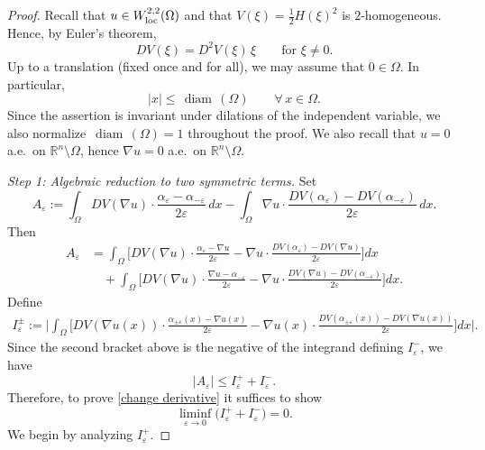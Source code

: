 \documentclass[reqno,11pt]{amsart}
\def\diam{{\mathop\mathrm{\,diam\,}}}
\numberwithin{equation}{section}
\theoremstyle{remark}
\begin{document}
\begin{proof}
Recall that $u\in W^{2,2}_{\rm loc}(\Omega)$ and that $V(\xi)=\frac12 H(\xi)^2$ is $2$-homogeneous. Hence, by Euler's theorem,
\[
DV(\xi)=D^2V(\xi)\,\xi \qquad \text{for }\xi\neq 0.
\]
Up to a translation (fixed once and for all), we may assume that $0\in\Omega$. In particular,
\begin{equation}\label{eq:xbound-diam}
|x|\le \diam(\Omega)\qquad \forall\,x\in\Omega.
\end{equation}
{Since the assertion is invariant under dilations of the independent variable, we also normalize
$\diam(\Omega)=1$ throughout the proof.}
We also recall that $u=0$ a.e.\ on $\mathbb R^n\setminus\Omega$, hence $\nabla u=0$ a.e.\ on $\mathbb R^n\setminus\Omega$.

\medskip
\noindent\textit{Step 1: Algebraic reduction to two symmetric terms.}
Set
\[
A_\varepsilon:=
\int_{\Omega} DV(\nabla u)\cdot \frac{\alpha_{\varepsilon}-\alpha_{-\varepsilon}}{2\varepsilon}\,dx
-
\int_{\Omega} \nabla u\cdot \frac{DV(\alpha_{\varepsilon})-DV(\alpha_{-\varepsilon})}{2\varepsilon}\,dx.
\]
Then
\begin{align*}
A_\varepsilon
&=\int_{\Omega} \Bigg[
DV(\nabla u)\cdot \frac{\alpha_{\varepsilon}-\nabla u}{2\varepsilon}
-\nabla u\cdot \frac{DV(\alpha_{\varepsilon})-DV(\nabla u)}{2\varepsilon}
\Bigg]dx\\
&\quad +\int_{\Omega} \Bigg[
DV(\nabla u)\cdot \frac{\nabla u-\alpha_{-\varepsilon}}{2\varepsilon}
-\nabla u\cdot \frac{DV(\nabla u)-DV(\alpha_{-\varepsilon})}{2\varepsilon}
\Bigg]dx.
\end{align*}
Define
\begin{align*}
I_\varepsilon^\pm
:=\Bigg|\int_{\Omega} \Bigg[
DV(\nabla u(x))\cdot \frac{\alpha_{\pm\varepsilon}(x)-\nabla u(x)}{2\varepsilon}
-\nabla u(x)\cdot \frac{DV(\alpha_{\pm\varepsilon}(x))-DV(\nabla u(x))}{2\varepsilon}
\Bigg]dx\Bigg|.
\end{align*}
Since the second bracket above is the negative of the integrand defining $I_\varepsilon^-$, we have
\[
|A_\varepsilon|\le I_\varepsilon^+ + I_\varepsilon^-.
\]
Therefore, to prove \eqref{change derivative} it suffices to show
\[
\liminf_{\varepsilon\to 0}\big(I_\varepsilon^+ + I_\varepsilon^-\big)=0.
\]
We begin by analyzing $I_\varepsilon^+$.


\end{proof}
\end{document}
